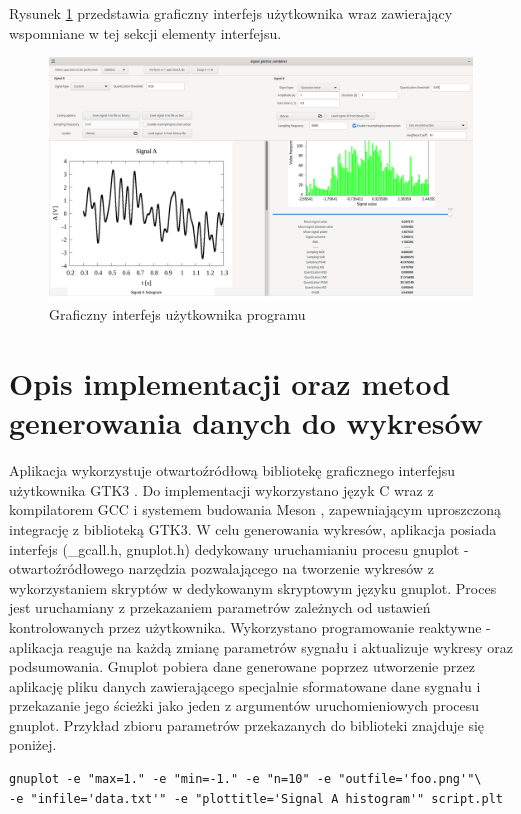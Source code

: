 \documentclass{article}
\begin{document}
Rysunek \ref{fig:gui} przedstawia graficzny interfejs użytkownika wraz zawierający wspomniane w tej sekcji elementy interfejsu.

\begin{figure}[h!]
 \centering
 \includegraphics[width=14cm]{gui2.png}
 \vspace{-0.3cm}
 \caption{Graficzny interfejs użytkownika programu}
 \label{fig:gui}
\end{figure}

\section{Opis implementacji oraz metod generowania danych do wykresów}
Aplikacja wykorzystuje otwartoźródłową bibliotekę graficznego interfejsu użytkownika GTK3 \cite{gtk3_link}.
Do implementacji wykorzystano język C wraz z kompilatorem GCC \cite{gcc_link} i systemem budowania Meson \cite{meson_link}, zapewniającym uproszczoną integrację z biblioteką GTK3.
W celu generowania wykresów, aplikacja posiada interfejs (\_gcall.h, gnuplot.h) dedykowany uruchamianiu procesu gnuplot - otwartoźródłowego narzędzia \cite{gnuplot_link} pozwalającego na tworzenie wykresów z wykorzystaniem skryptów w dedykowanym skryptowym języku gnuplot. Proces jest uruchamiany z przekazaniem parametrów zależnych od ustawień kontrolowanych przez użytkownika. Wykorzystano programowanie reaktywne - aplikacja reaguje na każdą zmianę parametrów sygnału i aktualizuje wykresy oraz podsumowania. Gnuplot pobiera dane generowane poprzez utworzenie przez aplikację pliku danych zawierającego specjalnie sformatowane dane sygnału i przekazanie jego ścieżki jako jeden z argumentów uruchomieniowych procesu gnuplot.
Przykład zbioru parametrów przekazanych do biblioteki znajduje się poniżej.
\begin{verbatim}
gnuplot -e "max=1." -e "min=-1." -e "n=10" -e "outfile='foo.png'"\ 
-e "infile='data.txt'" -e "plottitle='Signal A histogram'" script.plt
\end{verbatim}
\end{document}

